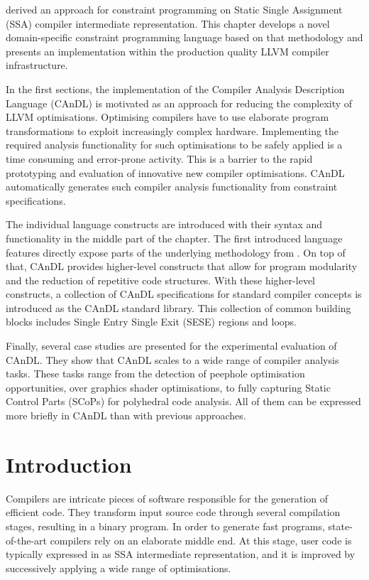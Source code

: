 
     derived an approach for constraint programming on
    Static Single Assignment (SSA) compiler intermediate representation.
    This chapter develops a novel domain-specific constraint programming
    language based on that methodology and presents an implementation within the
    production quality LLVM compiler infrastructure.

    In the first sections, the implementation of the Compiler Analysis
    Description Language (CAnDL) is motivated as an approach for reducing the
    complexity of LLVM optimisations.
    Optimising compilers have to use elaborate program transformations to
    exploit increasingly complex hardware.
    Implementing the required analysis functionality for such optimisations to
    be safely applied is a time consuming and error-prone activity.
    This is a barrier to the rapid prototyping and evaluation of innovative new
    compiler optimisations.
    CAnDL automatically generates such compiler analysis functionality from
    constraint specifications.

    The individual language constructs are introduced with their syntax and
    functionality in the middle part of the chapter.
    The first introduced language features directly expose parts of the
    underlying methodology from .
    On top of that, CAnDL provides higher-level constructs that allow for
    program modularity and the reduction of repetitive code structures.
    With these higher-level constructs, a collection of CAnDL specifications
    for standard compiler concepts is introduced as the CAnDL standard library.
    This collection of common building blocks includes Single Entry Single Exit
    (SESE) regions and loops.

    Finally, several case studies are presented for the experimental evaluation
    of CAnDL.
    They show that CAnDL scales to a wide range of compiler analysis tasks.
    These tasks range from the detection of peephole optimisation opportunities,
    over graphics shader optimisations, to fully capturing Static Control Parts
    (SCoPs) for polyhedral code analysis.
    All of them can be expressed more briefly in CAnDL than with previous
    approaches.

\section{Introduction}

    Compilers are intricate pieces of software responsible for the generation of
    efficient code.
    They transform input source code through several compilation stages,
    resulting in a binary program.
    In order to generate fast programs, state-of-the-art compilers rely on an
    elaborate middle end.
    At this stage, user code is typically expressed in as SSA intermediate
    representation, and it is improved by successively applying a wide range of
    optimisations.

